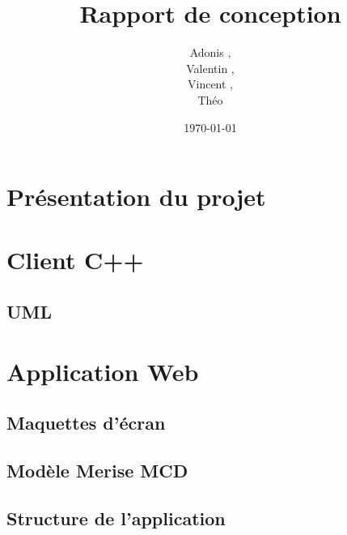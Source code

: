 \documentclass{article}
\title{Rapport de conception}
\author{Adonis \bsc{Najimi},\\
 Valentin \bsc{Stern},\\
 Vincent \bsc{Albert},\\
 Théo \bsc{Gerriet}}
\date{\today}
\begin{document}
\maketitle
\section{Présentation du projet}
\section{Client C++}
\subsection{UML}
\section{Application Web}
\subsection{Maquettes d'écran}
\subsection{Modèle Merise MCD}
\subsection{Structure de l'application}
\end{document}

